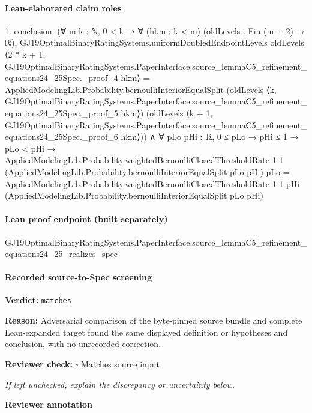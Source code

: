 \documentclass[10pt]{article}
\newcommand{\reviewerbox}{%
  \par\noindent\fbox{\parbox{0.96\linewidth}{\rule{0pt}{0.38in}}}\par
}
\newcommand{\reviewmatch}[1]{%
  \par\noindent\textbf{Reviewer check:} $\square$\; #1\par
  \noindent\emph{If left unchecked, explain the discrepancy or uncertainty below.}\par
}
\begin{document}
\paragraph{Lean-elaborated claim roles}\begin{ReviewVerbatim}
1. conclusion: (∀ {m k : ℕ},
    0 < k →
      ∀ (hkm : k < m) (oldLevels : Fin (m + 2) → ℝ),
        GJ19OptimalBinaryRatingSystems.uniformDoubledEndpointLevels oldLevels
            ⟨2 * k + 1,
              GJ19OptimalBinaryRatingSystems.PaperInterface.source_lemmaC5_refinement_equations24_25Spec._proof_4 hkm⟩ =
          AppliedModelingLib.Probability.bernoulliInteriorEqualSplit
            (oldLevels
              ⟨k,
                GJ19OptimalBinaryRatingSystems.PaperInterface.source_lemmaC5_refinement_equations24_25Spec._proof_5
                  hkm⟩)
            (oldLevels
              ⟨k + 1,
                GJ19OptimalBinaryRatingSystems.PaperInterface.source_lemmaC5_refinement_equations24_25Spec._proof_6
                  hkm⟩)) ∧
  ∀ {pLo pHi : ℝ},
    0 ≤ pLo →
      pHi ≤ 1 →
        pLo < pHi →
          AppliedModelingLib.Probability.weightedBernoulliClosedThresholdRate 1 1
              (AppliedModelingLib.Probability.bernoulliInteriorEqualSplit pLo pHi) pLo =
            AppliedModelingLib.Probability.weightedBernoulliClosedThresholdRate 1 1 pHi
              (AppliedModelingLib.Probability.bernoulliInteriorEqualSplit pLo pHi)
\end{ReviewVerbatim}

\paragraph{Lean proof endpoint (built separately)}\begin{ReviewVerbatim}
GJ19OptimalBinaryRatingSystems.PaperInterface.source_lemmaC5_refinement_equations24_25_realizes_spec
\end{ReviewVerbatim}

\paragraph{Recorded source-to-Spec screening}
\textbf{Verdict:} \texttt{matches}
\\
{\raggedright
\textbf{Reason:} Adversarial comparison of the byte-\allowbreak{}pinned source bundle and complete Lean-\allowbreak{}expanded target found the same displayed definition or hypotheses and conclusion, with no unrecorded correction.\allowbreak{}
\par}
\reviewmatch{Matches source input}
\noindent\textbf{Reviewer annotation}\par
\reviewerbox
\clearpage
\hypertarget{source-claim-4cea7b91f971b40f}{}
\end{document}
